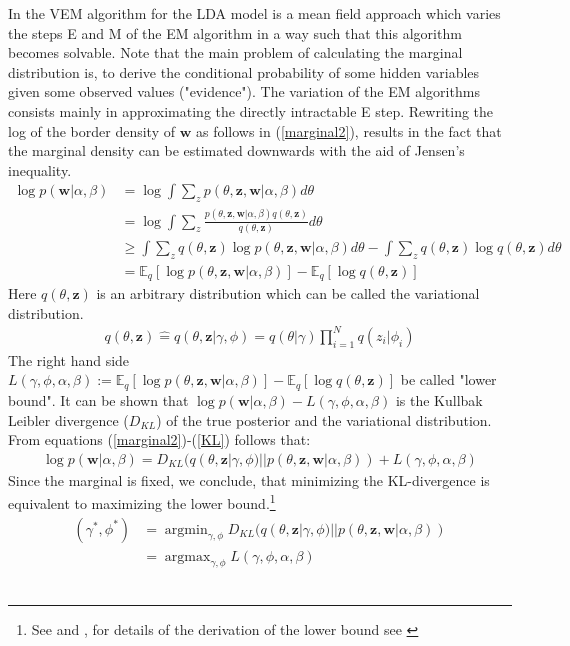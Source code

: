 \documentclass[11pt,a4paper]{article}
\DeclareMathOperator*{\argmin}{argmin}
\DeclareMathOperator*{\argmax}{argmax}
\begin{document}
In the VEM algorithm for the LDA model is a mean field approach which varies the steps E and M of the EM algorithm in a way such that this algorithm becomes solvable. Note that the main problem of calculating the marginal distribution is, to derive the conditional probability of some hidden variables given some observed values ("evidence"). The variation of the EM algorithms consists mainly in approximating the directly intractable E step.  Rewriting the log of the border density of $\textbf{w}$ as follows in (\ref{marginal2}), results in the fact that the marginal density can be estimated downwards with the aid of Jensen's inequality.
\begin{align}\label{marginal2}
	\log p(\textbf{w}|\alpha, \beta) &= \log \int \sum_{z} 
	p(\theta,\textbf{z},\textbf{w}|\alpha,\beta)d\theta\\
	& =\log \int \sum_{z} \frac{p(\theta,\textbf{z},\textbf{w}|\alpha,\beta) q(\theta,\textbf{z})}{q(\theta,\textbf{z})}d\theta\\
	&\geq \int \sum_{z} q(\theta,\textbf{z})\log p(\theta,\textbf{z},\textbf{w}|\alpha,\beta) d\theta - 
	\int \sum_{z} q(\theta,\textbf{z})\log q(\theta,\textbf{z})d\theta\\
	&= \mathbb{E}_q[\log p(\theta,\textbf{z},\textbf{w}|\alpha,\beta) ]-
	\mathbb{E}_q[\log q(\theta,\textbf{z})] \label{KL}
\end{align}
Here $q(\theta,\textbf{z})$ is an arbitrary distribution which can be called the variational distribution. 
\begin{align}
q(\theta,\textbf{z})\widehat{=}q(\theta,\textbf{z}|\gamma,\phi)
=q(\theta|\gamma) \prod_{i=1}^N q(z_i|\phi_i)
\end{align}
The right hand side $L(\gamma,\phi,\alpha, \beta):=\mathbb{E}_q[\log p(\theta,\textbf{z},\textbf{w}|\alpha,\beta) ]-
\mathbb{E}_q[\log q(\theta,\textbf{z})]$ be called "lower bound". It can be shown that $\log p(\textbf{w}|\alpha, \beta) - L(\gamma,\phi,\alpha, \beta)$ is the Kullbak Leibler divergence ($D_{KL}$) of the true posterior and the variational distribution. From equations (\ref{marginal2})-(\ref{KL}) follows that:
\begin{align}\label{equality}
\log p(\textbf{w}|\alpha, \beta)= D_{KL}(q(\theta,\textbf{z}|\gamma,\phi)||p(\theta,\textbf{z},\textbf{w}|\alpha,\beta)) + L(\gamma,\phi,\alpha, \beta)
\end{align}
Since the marginal is fixed, we conclude, that minimizing the KL-divergence is equivalent to maximizing the lower bound.\footnote{See \cite{Jordan1999} and \cite{Wainwright2008}, for details of the derivation of the lower bound see \cite{Blei2003}}
\begin{align}
(\gamma^*, \phi^*) &= \argmin_{\gamma, \phi}D_{KL}(q(\theta,\textbf{z}|\gamma,\phi)||p(\theta,\textbf{z},\textbf{w}|\alpha,\beta))\\
&= \argmax_{\gamma, \phi} L(\gamma,\phi,\alpha, \beta)
\end{align}\\
\end{document}
